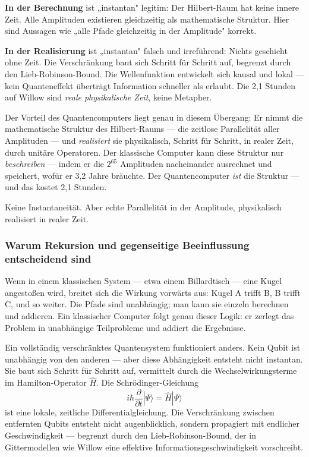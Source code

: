 \begin{important}
\textbf{In der Berechnung} ist „instantan" legitim: Der Hilbert-Raum hat keine
innere Zeit. Alle Amplituden existieren gleichzeitig als mathematische Struktur.
Hier sind Aussagen wie „alle Pfade gleichzeitig in der Amplitude" korrekt.

\textbf{In der Realisierung} ist „instantan" falsch und irreführend: Nichts
geschieht ohne Zeit. Die Verschränkung baut sich Schritt für Schritt auf,
begrenzt durch den Lieb-Robinson-Bound. Die Wellenfunktion entwickelt sich
kausal und lokal — kein Quanteneffekt überträgt Information schneller als erlaubt.
Die 2,1 Stunden auf Willow sind \emph{reale physikalische Zeit}, keine Metapher.
\end{important}

Der Vorteil des Quantencomputers liegt genau in diesem Übergang: Er nimmt
die mathematische Struktur des Hilbert-Raums — die zeitlose Parallelität aller
Amplituden — und \emph{realisiert} sie physikalisch, Schritt für Schritt, in
realer Zeit, durch unitäre Operatoren. Der klassische Computer kann diese
Struktur nur \emph{beschreiben} — indem er die $2^{65}$ Amplituden nacheinander
ausrechnet und speichert, wofür er 3,2 Jahre bräuchte. Der Quantencomputer
\emph{ist} die Struktur — und das kostet 2,1 Stunden.

Keine Instantaneität. Aber echte Parallelität in der Amplitude, physikalisch
realisiert in realer Zeit.

\subsubsection*{Warum Rekursion und gegenseitige Beeinflussung entscheidend sind}

Wenn in einem klassischen System — etwa einem Billardtisch — eine Kugel angestoßen
wird, breitet sich die Wirkung vorwärts aus: Kugel A trifft B, B trifft C, und so
weiter. Die Pfade sind unabhängig; man kann sie einzeln berechnen und addieren. Ein
klassischer Computer folgt genau dieser Logik: er zerlegt das Problem in unabhängige
Teilprobleme und addiert die Ergebnisse.

Ein vollständig verschränktes Quantensystem funktioniert anders.
Kein Qubit ist unabhängig von den anderen — aber diese Abhängigkeit entsteht
nicht instantan. Sie baut sich Schritt für Schritt auf, vermittelt durch die
Wechselwirkungsterme im Hamilton-Operator $\hat{H}$. Die Schrödinger-Gleichung
\begin{equation}
    i\hbar \frac{\partial}{\partial t}|\Psi\rangle = \hat{H}|\Psi\rangle
\end{equation}
ist eine lokale, zeitliche Differentialgleichung. Die Verschränkung zwischen
entfernten Qubits entsteht nicht augenblicklich, sondern propagiert mit endlicher
Geschwindigkeit — begrenzt durch den Lieb-Robinson-Bound, der in Gittermodellen
wie Willow eine effektive Informationsgeschwindigkeit vorschreibt.


